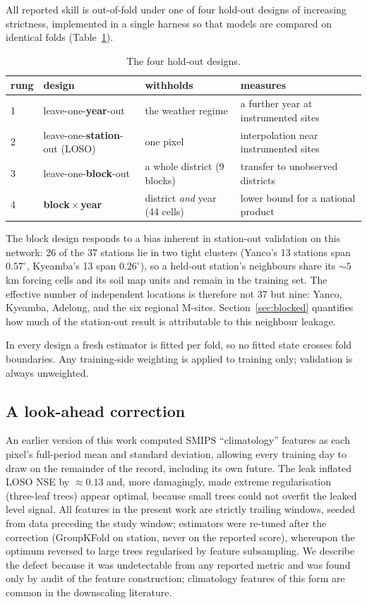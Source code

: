 \documentclass[11pt,a4paper]{article}
\begin{document}
All reported skill is out-of-fold under one of four hold-out designs of
increasing strictness, implemented in a single harness so that models are
compared on identical folds (Table~\ref{tab:ladder-designs}).

\begin{table}[htbp]
\centering
\caption{The four hold-out designs.}
\label{tab:ladder-designs}
\small
\begin{tabular}{llll}
\toprule
rung & design & withholds & measures \\
\midrule
1 & leave-one-\textbf{year}-out & the weather regime & a further year at instrumented sites \\
2 & leave-one-\textbf{station}-out (LOSO) & one pixel & interpolation near instrumented sites \\
3 & leave-one-\textbf{block}-out & a whole district (9 blocks) & transfer to unobserved districts \\
4 & \textbf{block\,$\times$\,year} & district \emph{and} year (44 cells) & lower bound for a national product \\
\bottomrule
\end{tabular}
\end{table}

The block design responds to a bias inherent in station-out validation on this
network: 26 of the 37 stations lie in two tight clusters (Yanco's 13 stations
span $0.57^\circ$, Kyeamba's 13 span $0.26^\circ$), so a held-out station's
neighbours share its ${\sim}5$\,km forcing cells and its soil map units and
remain in the training set. The effective number of independent locations is
therefore not 37 but nine: Yanco, Kyeamba, Adelong, and the six regional
M-sites. Section~\ref{sec:blocked} quantifies how much of the station-out
result is attributable to this neighbour leakage.

In every design a fresh estimator is fitted per fold, so no fitted state
crosses fold boundaries. Any training-side weighting is applied to training
only; validation is always unweighted.

\subsection{A look-ahead correction}\label{sec:leak}

An earlier version of this work computed SMIPS ``climatology'' features as
each pixel's full-period mean and standard deviation, allowing every training
day to draw on the remainder of the record, including its own future. The leak
inflated LOSO NSE by ${\approx}0.13$ and, more damagingly, made extreme
regularisation (three-leaf trees) appear optimal, because small trees could
not overfit the leaked level signal. All features in the present work are
strictly trailing windows, seeded from data preceding the study window;
estimators were re-tuned after the correction (GroupKFold on station, never on
the reported score), whereupon the optimum reversed to large trees
regularised by feature subsampling. We describe the defect because it was
undetectable from any reported metric and was found only by audit of the
feature construction; climatology features of this form are common in the
downscaling literature.
\end{document}
